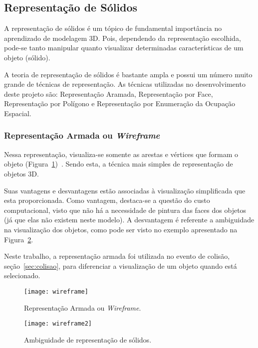 \subsection{Representação de Sólidos}
	A representação de sólidos é um tópico de fundamental importância no aprendizado de modelagem 3D. Pois, dependendo da representação escolhida, pode-se tanto manipular quanto visualizar determinadas características de um objeto (sólido).

	A teoria de representação de sólidos é bastante ampla e possui um número muito grande de técnicas de representação. As técnicas utilizadas no desenvolvimento deste projeto são: Representação Aramada, Representação por Face, Representação por Polígono e Representação por Enumeração da Ocupação Espacial.

\subsubsection{Representação Armada ou \textit{Wireframe}}
	Nessa representação, visualiza-se somente as arestas e vértices que formam o objeto (Figura~\ref{fg:wireframe})~\cite{speck}. Sendo esta, a técnica mais simples de representação de objetos 3D.

	Suas vantagens e desvantagens estão associadas à visualização simplificada que esta proporcionada. Como vantagem, destaca-se a questão do custo computacional, visto que não há a necessidade de pintura das faces dos objetos (já que elas não existem neste modelo). A desvantagem é referente a ambiguidade na visualização dos objetos, como pode ser visto no exemplo apresentado na Figura~\ref{fg:wireframe2}. 

	Neste trabalho, a representação armada foi utilizada no evento de colisão, seção~\ref{sec:colisao}, para diferenciar a visualização de um objeto quando está selecionado.
\begin{figure}[ht!]
	\centering
	\texttt{[image: wireframe]}
	\caption{Representação Armada ou \textit{Wireframe}.}
	\label{fg:wireframe}
\end{figure} 
\begin{figure}[ht!]
	\centering
	\texttt{[image: wireframe2]}
	\caption{Ambiguidade de representação de sólidos.}
	\label{fg:wireframe2}
\end{figure} 

